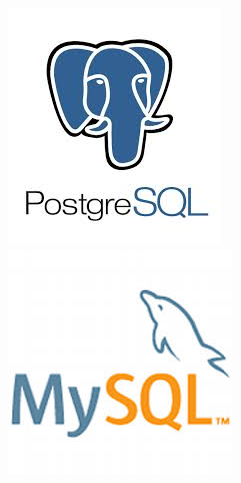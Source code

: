 \begin{frame}
\begin{columns}
\begin{column}{0.2\textwidth}
      \bigskip
      \includegraphics[width=.9\textwidth]{images/postgresql}\\
      \bigskip
      \includegraphics[width=.9\textwidth]{images/mysql}\\
    \end{column}
  \end{columns}	
\end{frame}

